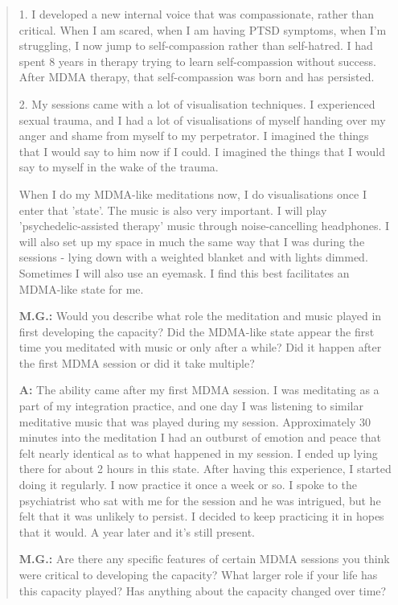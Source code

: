 \documentclass[12pt,letterpaper]{book}
\begin{document}
\begin{quotation}
    1. I developed a new internal voice that was compassionate, rather than critical. When I am scared, when I am having PTSD symptoms, when I'm struggling, I now jump to self-compassion rather than self-hatred. I had spent 8 years in therapy trying to learn self-compassion without success. After MDMA therapy, that self-compassion was born and has persisted.

    2. My sessions came with a lot of visualisation techniques. I experienced sexual trauma, and I had a lot of visualisations of myself handing over my anger and shame from myself to my perpetrator. I imagined the things that I would say to him now if I could. I imagined the things that I would say to myself in the wake of the trauma.

    When I do my MDMA-like meditations now, I do visualisations once I enter that 'state'. The music is also very important. I will play 'psychedelic-assisted therapy' music through noise-cancelling headphones. I will also set up my space in much the same way that I was during the sessions - lying down with a weighted blanket and with lights dimmed. Sometimes I will also use an eyemask. I find this best facilitates an MDMA-like state for me.

    \vspace{\baselineskip}

    \textbf{M.G.:} Would you describe what role the meditation and music played in first developing the capacity? Did the MDMA-like state appear the first time you meditated with music or only after a while? Did it happen after the first MDMA session or did it take multiple?

    \textbf{A:} The ability came after my first MDMA session. I was meditating as a part of my integration practice, and one day I was listening to similar meditative music that was played during my session. Approximately 30 minutes into the meditation I had an outburst of emotion and peace that felt nearly identical as to what happened in my session. I ended up lying there for about 2 hours in this state. After having this experience, I started doing it regularly. I now practice it once a week or so. I spoke to the psychiatrist who sat with me for the session and he was intrigued, but he felt that it was unlikely to persist. I decided to keep practicing it in hopes that it would. A year later and it's still present.

    \vspace{\baselineskip}

    \textbf{M.G.:} Are there any specific features of certain MDMA sessions you think were critical to developing the capacity? What larger role if your life has this capacity played? Has anything about the capacity changed over time?


\end{quotation}
\end{document}
